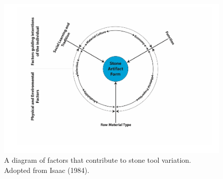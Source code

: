 \documentclass[]{elsarticle} %
\makeatletter
\def\maxwidth{\ifdim\Gin@nat@width>\linewidth\linewidth
\else\Gin@nat@width\fi}
\let\Oldincludegraphics\includegraphics
\renewcommand{\includegraphics}[1]{\Oldincludegraphics[width=\maxwidth]{#1}}
\makeatother
\begin{document}
\begin{figure}
\centering
\includegraphics{Reeves_Braun_et_al_2020_Kanjera_South_JHE_files/figure-latex/fig-1-1.pdf}
\caption{A diagram of factors that contribute to stone tool variation.
Adopted from Isaac (1984). \label{variation}}
\end{figure}
\end{document}

